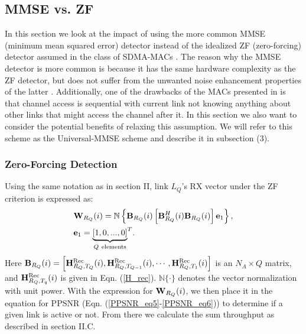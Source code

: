 \documentclass[journal, final]{IEEEtran}
\begin{document}
\subsection{MMSE vs. ZF}

In this section we look at the impact of using the more common MMSE (minimum
mean squared error) detector instead of the idealized ZF (zero-forcing) detector
assumed in the class of SDMA-MACs \cite{1_SPACEMAC, 2_MIMOMAN, 3_NULLHOC, 4_nullhoc}. The reason why the MMSE detector is
more common is because it has the same hardware complexity as the
ZF detector, but does not suffer from the unwanted noise
enhancement properties of the latter \cite{9_ZF_MMSE}. Additionally, one of the drawbacks of the MACs presented in \cite{1_SPACEMAC, 2_MIMOMAN, 3_NULLHOC, 4_nullhoc} is that channel access is sequential with current link not knowing anything about other links that might access the channel after it. In this section we also want to consider the potential benefits of relaxing this assumption. We will refer to this scheme as the Universal-MMSE scheme and describe it in subsection (3).

\subsubsection{Zero-Forcing Detection}

Using the same notation as in section II, link $L_Q $'s RX vector under the
ZF criterion is expressed as:
\begin{align}
\label{ZF_eq8}
&{\rm {\bf W}}_{R_Q } (i) = {\mathbb{N}}\left\{ {{\rm {\bf B}}_{R_Q } (i)\left[
{{\rm {\bf B}}_{R_Q }^H (i){\rm {\bf B}}_{R_Q } (i)} \right]{\rm {\bf e}}_1
} \right\}, \\
&{\rm {\bf e}}_1 = {\underbrace {[1,0,...,0]}_{Q\ {\rm elements}}}^T.
\end{align}
Here ${\rm {\bf B}}_{R_Q } (i)=\left[{\rm {\bf H}}_{R_Q ,T_Q }^{{\rm Rec}} (i), {\rm {\bf H}}_{R_Q ,T_{Q-1} }^{{\rm Rec}} (i), \cdots, {\rm {\bf H}}_{R_Q ,T_1 }^{{\rm Rec}} (i)\right]$ is an $N_A \times Q$ matrix, and ${\rm {\bf H}}_{R_Q ,T_q }^{{\rm Rec}} (i)$ is given in Eqn. (\ref{H_rec}). ${\mathbb{N}}\{ \cdot \}$ denotes the vector normalization with unit power. With the
expression for ${\rm {\bf W}}_{R_Q } (i)$, we then place it in the
equation for PPSNR (Eqn. (\ref{PPSNR_eq5}-\ref{PPSNR_eq6})) to determine if a given link is active or
not. From there we calculate the sum throughput as described in section II.C.
\end{document}
